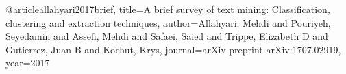 @article{allahyari2017brief,
  title={A brief survey of text mining: Classification, clustering and extraction techniques},
  author={Allahyari, Mehdi and Pouriyeh, Seyedamin and Assefi, Mehdi and Safaei, Saied and Trippe, Elizabeth D and Gutierrez, Juan B and Kochut, Krys},
  journal={arXiv preprint arXiv:1707.02919},
  year={2017}
}